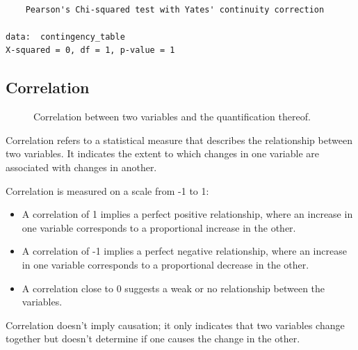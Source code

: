\documentclass[
  a4paper,
]{scrbook}
\begin{document}
\begin{verbatim}

    Pearson's Chi-squared test with Yates' continuity correction

data:  contingency_table
X-squared = 0, df = 1, p-value = 1
\end{verbatim}

\subsection{Correlation}\label{correlation}

\begin{figure}[ht]


\caption{\label{fig-corr}Correlation between two variables and the
quantification thereof.}

\end{figure}%

Correlation refers to a statistical measure that describes the
relationship between two variables. It indicates the extent to which
changes in one variable are associated with changes in another.

Correlation is measured on a scale from -1 to 1:

\begin{itemize}
\item
  A correlation of 1 implies a perfect positive relationship, where an
  increase in one variable corresponds to a proportional increase in the
  other.
\item
  A correlation of -1 implies a perfect negative relationship, where an
  increase in one variable corresponds to a proportional decrease in the
  other.
\item
  A correlation close to 0 suggests a weak or no relationship between
  the variables.
\end{itemize}

Correlation doesn't imply causation; it only indicates that two
variables change together but doesn't determine if one causes the change
in the other.
\end{document}
